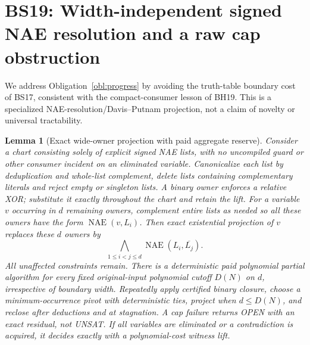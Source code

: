 \documentclass[11pt]{article}
\newtheorem{lemma}[theorem]{Lemma}
\begin{document}
\section{BS19: Width-independent signed NAE resolution and a raw cap obstruction}\label{sec:bs19}
We address Obligation~\ref{obl:progress} by avoiding the truth-table boundary cost of BS17, consistent with the compact-consumer lesson of BH19. This is a specialized NAE-resolution/Davis--Putnam projection, not a claim of novelty or universal tractability.
\begin{lemma}[Exact wide-owner projection with paid aggregate reserve]\label{lem:bs19-nae}
Consider a chart consisting solely of explicit signed NAE lists, with no uncompiled guard or other consumer incident on an eliminated variable. Canonicalize each list by deduplication and whole-list complement, delete lists containing complementary literals and reject empty or singleton lists. A binary owner enforces a relative XOR; substitute it exactly throughout the chart and retain the lift. For a variable $v$ occurring in $d$ remaining owners, complement entire lists as needed so all these owners have the form $\operatorname{NAE}(v,L_i)$. Then exact existential projection of $v$ replaces these $d$ owners by
\[
 \bigwedge_{1\le i<j\le d}\operatorname{NAE}(L_i,\overline{L_j}).
\]
All unaffected constraints remain. There is a deterministic paid polynomial partial algorithm for every fixed original-input polynomial cutoff $D(N)$ on $d$, irrespective of boundary width. Repeatedly apply certified binary closure, choose a minimum-occurrence pivot with deterministic ties, project when $d\le D(N)$, and reclose after deductions and at stagnation. A cap failure returns OPEN with an exact residual, not UNSAT. If all variables are eliminated or a contradiction is acquired, it decides exactly with a polynomial-cost witness lift.
\end{lemma}
\end{document}
